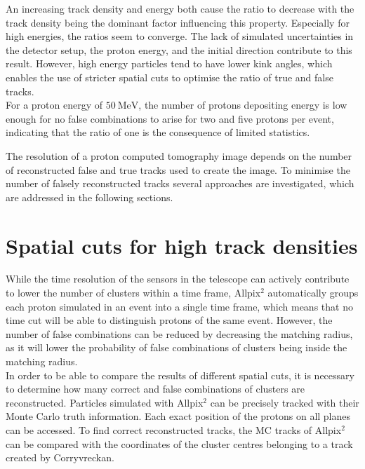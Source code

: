 An increasing track density and energy both cause the ratio to decrease with the track density being the dominant factor influencing this property. Especially for high energies,
the ratios seem to converge. The lack of simulated uncertainties in the detector setup,
the proton energy, and the initial direction contribute to this result. However, high energy particles tend to have lower kink angles, which enables the use of
stricter spatial cuts to optimise the ratio of true and false tracks. \\
For a proton energy of $\SI{50}{\mega\eV}$, the number of protons depositing energy is low enough for no false combinations to arise for two and five
protons per event, indicating that the ratio of one is the consequence of limited statistics.

The resolution of a proton computed tomography image depends on the number of reconstructed false and true tracks used to create the image.
To minimise the number of falsely reconstructed tracks several approaches are
investigated, which are addressed in the following sections.



\section{Spatial cuts for high track densities} \label{sec:cuts}
While the time resolution of the sensors in the telescope can actively contribute to lower the number of clusters within a time frame,
Allpix$^2$ automatically groups each proton simulated in an event into a single time frame, which means that no time cut will be able
to distinguish protons of the same event. However, the number of false combinations can be reduced by decreasing the matching radius, as
it will lower the probability of false combinations of clusters being inside the matching radius. \\
In order to be able to compare the results of different spatial cuts, it is necessary to determine how many correct and false combinations of clusters
are reconstructed. Particles simulated with Allpix$^2$ can be precisely tracked with their Monte Carlo truth information. Each exact
position of the protons on all planes can be accessed. To find correct reconstructed tracks, the MC tracks of Allpix$^2$ can be
compared with the coordinates of the cluster centres belonging to a track created by Corryvreckan. \\

